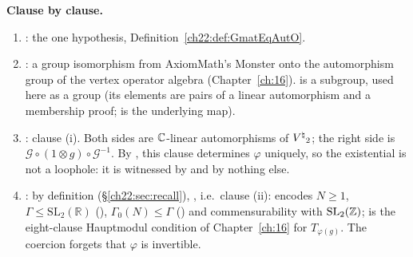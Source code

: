 \begin{dictionary}
\textbf{Clause by clause.}
\begin{enumerate}[label=(\arabic*)]
\item {}: the one hypothesis, Definition~\ref{ch22:def:GmatEqAutO}.
\item {}: a group isomorphism from AxiomMath's Monster onto the automorphism group of the vertex
  operator algebra  (Chapter~\ref{ch:16}).   is a subgroup, used here as a group (its elements are
  pairs of a linear automorphism and a membership proof;  is the underlying map).
\item {}: clause (i).  Both sides are
  ${\mathbb{C}}$-linear automorphisms of ${V^{\natural}}_2$; the right side is $\mathcal G\circ(1\otimes g)\circ\mathcal G^{-1}$.  By
  , this clause determines $\varphi$ uniquely, so the existential is not a loophole:
  it is witnessed by  and by nothing else.
\item {}: by definition (\S\ref{ch22:sec:recall}),
  , i.e.\ clause (ii):  encodes $N\ge1$,
  $\Gamma\le\mathrm{SL}_2(\mathbb{R})$ (), $\Gamma_0(N)\le\Gamma$ () and commensurability with
  $\mathrm{SL}_2({\mathbb{Z}})$;  is the eight-clause Hauptmodul condition of
  Chapter~\ref{ch:16} for $T_{\varphi(g)}$.  The coercion  forgets that $\varphi$ is invertible.
\end{enumerate}


\end{dictionary}
